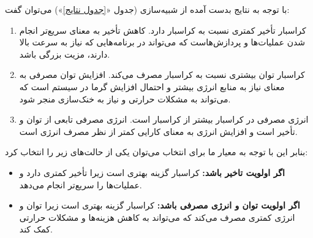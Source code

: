 \documentclass[12pt]{exam}
\begin{document}
\begin{questions}
	
	
با توجه به نتایج بدست آمده از شبیه‌سازی (جدول «\textcolor{blue}{\ref*{جدول نتایج}}») می‌توان گفت:

\begin{enumerate}
	\item
	کراسبار  تأخیر کمتری نسبت به کراسبار  دارد. کاهش تأخیر به معنای سریع‌تر انجام شدن عملیات‌ها و پردازش‌هاست که می‌تواند در برنامه‌هایی که نیاز به سرعت بالا دارند، مزیت بزرگی باشد.
	
	\item
	کراسبار  توان بیشتری نسبت به کراسبار  مصرف می‌کند. افزایش توان مصرفی به معنای نیاز به منابع انرژی بیشتر و احتمال افزایش گرما در سیستم است که می‌تواند به مشکلات حرارتی و نیاز به خنک‌سازی منجر شود.
	
	\item
	انرژی مصرفی در کراسبار  بیشتر از کراسبار  است. انرژی مصرفی تابعی از توان و تأخیر است و افزایش انرژی به معنای کارایی کمتر از نظر مصرف انرژی است.
\end{enumerate}



	بنابر این با توجه به معیار ما برای انتخاب می‌توان یکی از حالت‌های زیر را انتخاب کرد:
	\begin{itemize}
		\item \textbf{اگر اولویت تاخیر باشد:}
		کراسبار  گزینه بهتری است زیرا تأخیر کمتری دارد و عملیات‌ها را سریع‌تر انجام می‌دهد.
		
		\item \textbf{اگر اولویت توان و انرژی مصرفی باشد:}
		کراسبار  گزینه بهتری است زیرا توان و انرژی کمتری مصرف می‌کند که می‌تواند به کاهش هزینه‌ها و مشکلات حرارتی کمک کند.
	\end{itemize}
	
	
 \end{questions}
\end{document}
